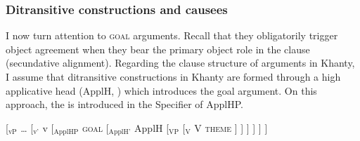 \documentclass[output=paper
,modfonts
,nonflat]{langsci/langscibook}
\begin{document}
\subsubsection{Ditransitive constructions and causees}\largerpage[2]

I now turn attention to \textsc{goal} arguments. Recall that they obligatorily trigger object agreement when they bear the primary object role in the clause (secundative alignment). 
Regarding the clause structure of \goal{} arguments in Khanty, I assume that ditransitive constructions in Khanty are formed through a high applicative head (ApplH, \citealt{pylkkanen2008}) which introduces the goal argument.
On this approach, the \goal{} is introduced in the Specifier of ApplHP. 


\begin{exe}
\ex \label{tree:highappl}
 { [$_{\textrm{vP}}$ {\ldots} [$_{\textrm{v'}}$ v [$_{\textrm{ApplHP}}$ \textsc{goal} [$_{\textrm{ApplH'}}$ ApplH [$_{\textrm{VP}}$ {} [$_{\textrm{V}}$ V \textsc{theme}  ] ] ] ] ] ]}

\end{exe}
\end{document}
